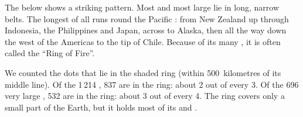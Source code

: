 The  below shows a striking pattern. Most  and most large
 lie in long, narrow belts. The longest of all runs round the
Pacific : from New Zealand up through Indonesia, the Philippines and
Japan, across to Alaska, then all the way down the west  of the
Americas to the tip of Chile. Because of its many , it is often
called the ``Ring of Fire''.

\begin{example}\label{ex:g4:volcanoes-earthquakes-first-look:shares}
We counted the dots that lie in the shaded ring (within 500~kilometres of
its middle line). Of the 1\,214 , 837 are in the ring: about 2 out
of every 3. Of the 696 very large , 532 are in the ring: about
3 out of every 4. The ring covers only a small part of the Earth, but it
holds most of its  and .
\end{example}

